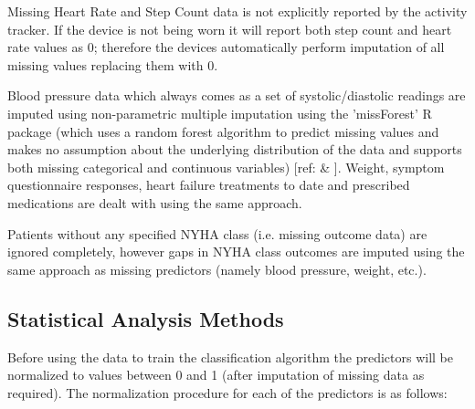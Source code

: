 \documentclass[]{article}
\begin{document}
Missing Heart Rate and Step Count data is not explicitly reported by the activity tracker. If the device is not being worn it will report both step count and heart rate values as 0; therefore the devices automatically perform imputation of all missing values replacing them with 0.

Blood pressure data which always comes as a set of systolic/diastolic readings are imputed using non-parametric multiple imputation using the 'missForest' R package (which uses a random forest algorithm to predict missing values and makes no assumption about the underlying distribution of the data and supports both missing categorical and continuous variables) [ref:   \& ]. Weight, symptom questionnaire responses, heart failure treatments to date and prescribed medications are dealt with using the same approach.

Patients without any specified NYHA class (i.e. missing outcome data) are ignored completely, however gaps in NYHA class outcomes are imputed using the same approach as missing predictors (namely blood pressure, weight, etc.).

\subsection{Statistical Analysis Methods} %

Before using the data to train the classification algorithm the predictors will be normalized to values between 0 and 1 (after imputation of missing data as required). The normalization procedure for each of the predictors is as follows:
\end{document}
